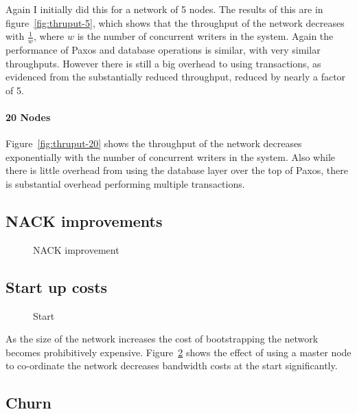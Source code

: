 \documentclass[12pt,twoside,notitlepage]{report}
\newcommand{\lwincludegraphics}[2][]{%
  \sbox{0}{\texttt{[image: \#2]}}%
  \ifdim\wd0>\linewidth
    \resizebox{\linewidth}{!}{\box0 }%
  \else
    \leavevmode\box0
  \fi}
\begin{document}
Again I initially did this for a network of 5 nodes. The results of this are in
figure~\ref{fig:thruput-5}, which shows that the throughput of the network decreases with
$\frac{1}{w}$, where $w$ is the number of concurrent writers in the system. Again the performance of
Paxos and database operations is similar, with very similar throughputs. However there is still a
big overhead to using transactions, as evidenced from the substantially reduced throughput,
reduced by nearly a factor of 5.

\paragraph{20 Nodes}

Figure~\ref{fig:thruput-20} shows the throughput of the network decreases exponentially with the
number of concurrent writers in the system. Also while there is little overhead from using the
database layer over the top of Paxos, there is substantial overhead performing multiple
transactions.

\subsection{NACK improvements}

\begin{figure}[Hp]
\centering
\lwincludegraphics[scale=2]{figs/lat_nack.eps}
\caption{\label{fig:nack}NACK improvement}
\end{figure}

\subsection{Start up costs}

\begin{figure}[Hp]
\centering
\lwincludegraphics[scale=2]{figs/start.eps}
\caption{\label{fig:start}Start}
\end{figure}

As the size of the network increases the cost of bootstrapping the network becomes prohibitively
expensive. Figure~\ref{fig:start} shows the effect of using a master node to co-ordinate the
network decreases bandwidth costs at the start significantly.

\subsection{Churn}

\begin{figure}[H]
\centering
{}
\end{figure}
\end{document}
